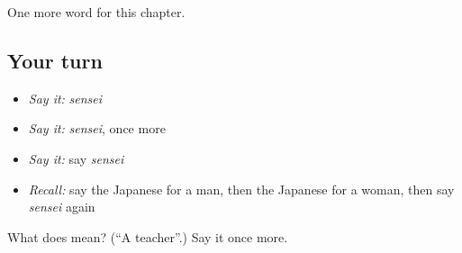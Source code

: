 \begin{grammarlens}[title={What you've built}]
One more word for this chapter.
\end{grammarlens}

\subsection*{Your turn}
\begin{itemize}
\raggedright
  \item \emph{Say it:} \emph{sensei}
  \item \emph{Say it:} \emph{sensei}, once more
  \item \emph{Say it:} say \emph{sensei}
  \item \emph{Recall:} say the Japanese for a man, then the Japanese for a woman, then say \emph{sensei} again
\end{itemize}

\begin{tcolorbox}[breakable,colback=teal!4,colframe=teal!35!black,title={Before you move on}]
What does  mean? (\textquotedblleft{}A teacher\textquotedblright{}.) Say it once more.
\end{tcolorbox}
